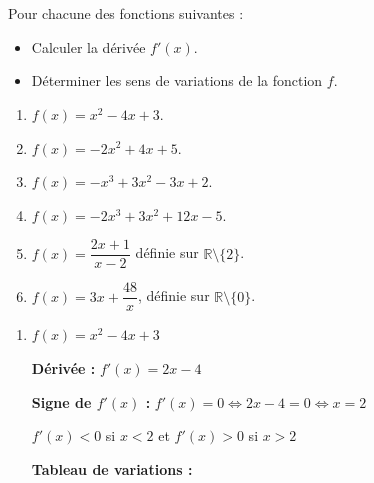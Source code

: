 \documentclass[1,DS,p,e,prof]{phBook}
\begin{document}
\setcounter{chapter}{3} %
\chapter{} %

\begin{exercice}
    \begin{enonce}
        Pour chacune des fonctions suivantes :
        \begin{itemize}
            \item Calculer la dérivée \(f'(x)\).
            \item Déterminer les sens de variations de la fonction \(f\).
        \end{itemize}
        \begin{enumerate}
            \item \(f(x)=x^2-4x+3\).
            \item \(f(x)=-2x^2+4x+5\).
            \item \(f(x)=-x^3+3x^2-3x+2\).
            \item \(f(x)=-2x^3+3x^2+12x-5\).
            \item \(f(x)=\dfrac{2x+1}{x-2}\) définie sur \(\mathbb{R}\setminus\{2\}\).
            \item \(f(x)=3x+\dfrac{48}{x}\), définie sur \(\mathbb{R}\setminus\{0\}\).
        \end{enumerate}
    \end{enonce}
    \begin{correction} %
        \begin{enumerate}
            \item $f(x)=x^2-4x+3$
            
            \textbf{Dérivée :} $f'(x)=2x-4$
            
            \textbf{Signe de $f'(x)$ :} $f'(x)=0 \Leftrightarrow 2x-4=0 \Leftrightarrow x=2$
            
            $f'(x)<0$ si $x<2$ et $f'(x)>0$ si $x>2$
            
            \textbf{Tableau de variations :}
            \begin{center}
            \end{center}
            

\end{enumerate}
\end{correction}
\end{exercice}
\end{document}

